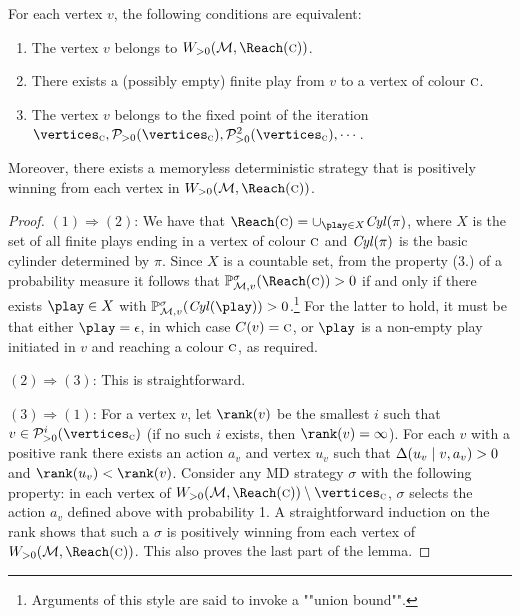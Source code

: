 \begin{theorem}
\label{5-thm:positive-char}
For each vertex $v$, the following conditions are equivalent:
\begin{enumerate}
\item The vertex $v$ belongs to $\winPos(\mdp,\Reach(\genColour))$.
\item There 
exists a (possibly empty) finite play from $v$ to a vertex of colour $\textsc{c}$.
\item The vertex $v$ 
belongs to the fixed point of the iteration $\vertices_\genColour, 
\PreOPPos(\vertices_\genColour),\PreOPPos^2(\vertices_\genColour),\cdots$.
\end{enumerate}
Moreover, there exists a memoryless deterministic strategy that is positively 
winning from each vertex in $\winPos(\mdp,\Reach(\genColour))$.
\end{theorem}
\begin{proof}
$(1)\Rightarrow(2)$: We have that $\Reach(\genColour) = \cup_{\play \in X} 
\cylinder(\pi)$, where $X$ is the set of all finite plays ending in a vertex of 
colour $\textsc{c}$ and $\mathit{Cyl}(\pi)$ is the basic cylinder determined by 
$\pi$. Since $X$ is a countable set, from the property (3.) of a probability 
measure it follows that $\probm^\sigma_{\mdp,v}(\Reach(\genColour))>0$ if and 
only if there exists $\play\in X$ with 
$\probm^\sigma_{\mdp,v}(\cylinder(\play))>0$.\footnote{Arguments of this style are said to invoke a ""union bound"". } For the latter to hold, it must 
be that either $\play=\emptyPlay$, in which case $C(v)=\textsc{c}$, or 
$\play$ is a non-empty play initiated in $v$ and reaching a colour 
$\textsc{c}$, as required.


$(2)\Rightarrow(3)$:
This is straightforward.
	
$(3)\Rightarrow (1)$:	
For a vertex $v$, let $\rank(v)$ be the smallest $i$ such that $v \in 
\PreOPPos^i(\vertices_\genColour)$ (if no such $i$ exists, then 
$\rank(v)=\infty$). For each $v$ with a positive rank there exists an action 
$a_v$ and vertex $u_v$ such that $\Delta(u_v\mid v,a_v)>0$ and 
$\rank(u_v)< \rank(v)$. Consider any MD strategy $  \sigma $ with the following property: 
in each vertex of 
$\winPos(\mdp,\Reach(\genColour))\setminus \vertices_{\genColour}$, $ \sigma $ selects the 
action $a_v$ defined above with probability 1. A straightforward induction on the rank shows that such a $ \sigma $ is positively winning from each vertex of 
$\winPos(\mdp,\Reach(\genColour))$. This also proves the last part 
of the lemma.
\end{proof}

